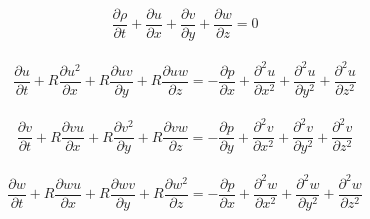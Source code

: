 \documentclass{article}
\begin{document}






\[
\begin{aligned}
    \dfrac{\partial \rho}{\partial t} + \dfrac{\partial u}{\partial x} + \dfrac{\partial v}{\partial y} + \dfrac{\partial w}{\partial z} = 0
\end{aligned}
\]


\[
\begin{aligned}
    \dfrac{\partial u}{\partial t} + R \dfrac{\partial u^2}{\partial x} + R\dfrac{\partial uv}{\partial y} + R\dfrac{\partial uw}{\partial z} = -\dfrac{\partial p}{\partial x} + \dfrac{\partial^2 u}{\partial x^2} + \dfrac{\partial^2 u}{\partial y^2} + \dfrac{\partial^2 u}{\partial z^2}
\end{aligned}
\]

\[
\begin{aligned}
    \dfrac{\partial v}{\partial t} + R \dfrac{\partial vu}{\partial x} + R\dfrac{\partial v^2}{\partial y} + R\dfrac{\partial vw}{\partial z} = -\dfrac{\partial p}{\partial y} + \dfrac{\partial^2 v}{\partial x^2} + \dfrac{\partial^2 v}{\partial y^2} + \dfrac{\partial^2 v}{\partial z^2}
\end{aligned}
\]

\[
\begin{aligned}
    \dfrac{\partial w}{\partial t} + R \dfrac{\partial wu}{\partial x} + R\dfrac{\partial wv}{\partial y} + R\dfrac{\partial w^2}{\partial z} = -\dfrac{\partial p}{\partial x} + \dfrac{\partial^2 w}{\partial x^2} + \dfrac{\partial^2 w}{\partial y^2} + \dfrac{\partial^2 w}{\partial z^2}
\end{aligned}
\]
\end{document}
